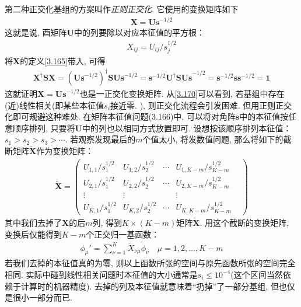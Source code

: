第二种正交化基组的方案叫作\emph{正则正交化}. 
它使用的变换矩阵如下
\begin{align}
	\mathbf{X=Us}^{-1/2}
\end{align}
这就是说, 
酉矩阵$\mathbf{U}$中的列要除以对应本征值的平方根：
\begin{align}
	\label{3.170}
	X_{ij} = U_{ij}/s_{j}^{1/2}
\end{align}
将$\mathbf{X}$的定义\autoref{3.165}带入, 
可得
\begin{align}
	\mathbf{X^\dagger SX} = (\mathbf{Us}^{-1/2})^\dagger\mathbf{SUs}^{-1/2} = \mathbf{s}^{-1/2}\mathbf{U^\dagger SUs}^{-1/2} = \mathbf{s}^{-1/2}\mathbf{ss}^{-1/2}=\mathbf{1}
\end{align}
这就证明$\mathbf{X=Us}^{-1/2}$也是一正交化变换矩阵. 
从\autoref{3.170}可以看到, 
若基组中存在(近)线性相关(即某些本征值$s_i$接近零.
), 
则正交化流程会引发困难. 
但用正则正交化即可规避这种难处. 
在矩阵本征值问题(3.166)中, 
可以将对角阵$\mathbf{s}$中的本征值按任意顺序排列, 
只要将$\mathbf{U}$中的列也以相同方式放置即可. 
设想按该顺序排列本征值：$s_1>s_2>s_3>\cdots$. 
若观察发现最后的$m$个值太小, 
将发数值问题, 
那么将如下的截断矩阵$\mathbf{\tilde{X}}$作为变换矩阵：
\begin{align}
	\tilde{\mathbf{X}} =
	\begin{pmatrix}
		U_{1,1}/s^{1/2}_{1} & U_{1,2}/s^{1/2}_{2} & \cdots & U_{1,K-m}/s^{1/2}_{K-m} &  \\
		U_{2,1}/s^{1/2}_{1} & U_{2,2}/s^{1/2}_{2} & \cdots & U_{2,K-m}/s^{1/2}_{K-m} &  \\
		\vdots              & \vdots              &        & \vdots                  &  \\
		U_{K,1}/s^{1/2}_{1} & U_{K,2}/s^{1/2}_{2} & \cdots & U_{K,K-m}/s^{1/2}_{K-m} &
	\end{pmatrix}
\end{align}
其中我们去掉了$\mathbf{X}$的后$m$列, 
得到$K\times (K-m)$矩阵$\tilde{\mathbf{X}}$. 
用这个截断的变换矩阵, 
变换后仅能得到$K-m$个正交归一基函数：
\begin{align}
	\phi_\mu' = \sum_{\nu=1}^{K}\tilde{X}_{\nu\mu}\phi_\nu\quad\mu=1,2,\ldots,K-m
\end{align}
若我们去掉的本征值真的为零, 
则以上函数所张的空间与原先函数所张的空间完全相同. 
实际中碰到线性相关问题时本征值的大小通常是$s_i\leqslant 10^{-4}$(这个区间当然依赖于计算时的机器精度). 
去掉的列及本征值就意味着``扔掉''了一部分基组, 
但也仅是很小一部分而已.


